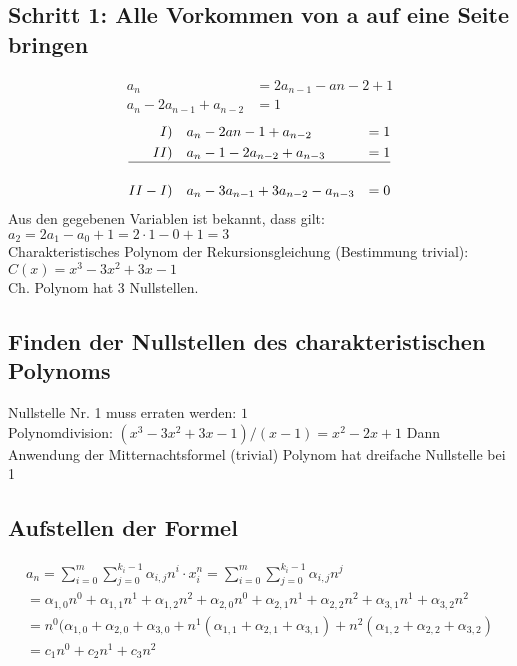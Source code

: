 \documentclass[a4paper,10pt,freqn]{article}
\begin{document}
\subsection{Schritt 1: Alle Vorkommen von a auf eine Seite bringen}
\begin{align*}
a_n &= 2a_{n-1}-a{n-2}+1 \\
a_n-2a_{n-1}+a_{n-2}&=1
\end{align*}
\begin{align*}
I)\quad&a_n-2a{n-1}+a_{n-2}&=1\\
II)\quad&a_n-1-2a_{n-2}+a_{n-3}&=1\\
\hline\\
II-I)\quad&a_n-3a_{n-1}+3a_{n-2}-a_{n-3}&=0\label{(1)-(2)}
\end{align*}
Aus den gegebenen Variablen ist bekannt, dass gilt:\\$a_2 = 2a_1-a_0+1 = 2\cdot1-0+1=3$\\

Charakteristisches Polynom der Rekursionsgleichung (Bestimmung trivial):\\
$C(x) = x^3-3x^2+3x-1$\\
\textrightarrow Ch. Polynom hat 3 Nullstellen.
\subsection{Finden der Nullstellen des charakteristischen Polynoms}
Nullstelle Nr. 1 muss erraten werden: $1$\\
Polynomdivision: $(x^3-3x^2+3x-1)/(x-1)=x^2-2x+1$
Dann Anwendung der Mitternachtsformel (trivial) \textrightarrow Polynom hat dreifache Nullstelle bei 1
\subsection{Aufstellen der Formel}
\begin{eqnarray*}
 a_n = \sum_{i=0}^m\sum_{j=0}^{k_i-1} \alpha_{i,j}n^i
 \cdot x_i^n  =\sum_{i=0}^m\sum_{j=0}^{k_i-1} \alpha_{i,j}n^j\\
 =\alpha_{1,0}n^0+\alpha_{1,1}n^1+\alpha_{1,2}n^2+\alpha_{2,0}n^0+\alpha_{2,1}n^1+\alpha_{2,2}n^2+\alpha_{3,1}n^1+\alpha_{3,2}n^2\\=
 n^0(\alpha_{1,0}+\alpha_{2,0}+\alpha_{3,0}+n^1(\alpha_{1,1}+\alpha_{2,1}+\alpha_{3,1})+n^2(\alpha_{1,2}+\alpha_{2,2}+\alpha_{3,2})\\=
 c_1n^0+c_2n^1+c_3n^2
\end{eqnarray*}
\end{document}
